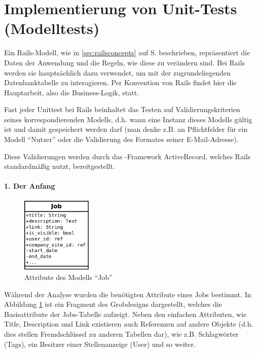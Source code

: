 \section{Implementierung von Unit-Tests (Modelltests)}
\label{sec:awunit}

Ein Rails-Modell, wie in \ref{sec:railsconcepts} auf S. \pageref{sec:railsconcepts} beschrieben, repräsentiert die Daten der Anwendung und die Regeln, wie diese zu verändern sind. Bei Rails werden sie hauptsächlich dazu verwendet, um mit der zugrundeliegenden Datenbanktabelle zu interagieren. Per Konvention von Rails findet hier die Hauptarbeit, also die Business-Logik, statt.

Fast jeder Unittest bei Rails beinhaltet das Testen auf Validierungskriterien seines korrespondierenden Modells, d.h. wann eine Instanz dieses Modells gültig ist und damit gespeichert werden darf (man denke z.B. an Pflichtfelder für ein Modell "`Nutzer"' oder die Validierung des Formates seiner E-Mail-Adresse).

Diese Validierungen werden durch das -Framework ActiveRecord, welches Rails standardmäßig nutzt, bereitgestellt.

\paragraph{1. Der Anfang}
\begin{figure}[htbp]
 \centering

 \includegraphics[width=0.3\textwidth]{./diagrams/job-erm.png}
 \caption{Attribute des Modells "`Job"'}
  \label{fig:job-erm}
\end{figure}

Während der Analyse wurden die benötigten Attribute eines Jobs bestimmt. In Abbildung \ref{fig:job-erm} ist ein Fragment des Grobdesigns dargestellt, welches die Basisattribute der Jobs-Tabelle aufzeigt. Neben den einfachen Attributen, wie Title, Description und Link existieren auch Referenzen auf andere Objekte (d.h. dies stellen Fremdschlüssel zu anderen Tabellen dar), wie z.B. Schlagwörter (Tags), ein Besitzer einer Stellenanzeige (User) und so weiter.


